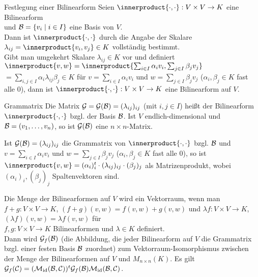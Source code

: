 \begin{Satz}{Festlegung einer Bilinearform}
    Seien $\innerproduct{\cdot, \cdot}: V \times V \rightarrow K$ eine Bilinearform \\
    und $\mathcal{B} = \{v_i \;|\; i \in I\}$ eine Basis von $V$. \\
    Dann ist $\innerproduct{\cdot, \cdot}$ durch die Angabe der Skalare
    $\lambda_{ij} = \innerproduct{v_i, v_j} \in K$ vollständig bestimmt. \\
    Gibt man umgekehrt Skalare $\lambda_{ij} \in K$ vor und definiert
    $\innerproduct{v, w} = \innerproduct{\sum_{i \in I} \alpha_i v_i, \sum_{j \in I} \beta_j v_j}$\\
    $= \sum_{i, j \in I} \alpha_i \lambda_{ij} \beta_j \in K$
    für $v = \sum_{i \in I} \alpha_i v_i$ und
    $w = \sum_{j \in I} \beta_j v_j$ ($\alpha_i, \beta_j \in K$ fast alle $0$),
    dann ist $\innerproduct{\cdot, \cdot}: V \times V \rightarrow K$ eine Bilinearform
    auf $V$.
\end{Satz}

\begin{Def}{Grammatrix}
    Die Matrix $\mathcal{G} = \mathcal{G}(\mathcal{B}) = (\lambda_{ij})_{ij}$
    (mit $i, j \in I$) heißt  der Bilinearform
    $\innerproduct{\cdot, \cdot}$ bzgl. der Basis $\mathcal{B}$.
    Ist $V$ endlich-dimensional und $\mathcal{B} = (v_1, \ldots, v_n)$,
    so ist $\mathcal{G}(\mathcal{B})$ eine $n \times n$-Matrix.
\end{Def}

\begin{Bem}
    Ist $\mathcal{G}(\mathcal{B}) = (\lambda_{ij})_{ij}$ die Grammatrix
    von $\innerproduct{\cdot, \cdot}$ bzgl. $\mathcal{B}$ und
    $v = \sum_{i \in I} \alpha_i v_i$ und $w = \sum_{j \in I} \beta_j v_j$
    ($\alpha_i, \beta_j \in K$ fast alle $0$), so ist
    $\innerproduct{v, w} = (\alpha_i)_i^t \cdot (\lambda_{ij})_{ij} \cdot (\beta_j)_j$
    als Matrizenprodukt, wobei $(\alpha_i)_i, (\beta_j)_j$ Spaltenvektoren
    sind.
\end{Bem}

\begin{Bem}
    Die Menge der Bilinearformen auf $V$ wird ein Vektorraum, wenn
    man $f+g: V \times V \rightarrow K$, $(f+g)(v, w) = f(v, w) + g(v, w)$
    und $\lambda f: V \times V \rightarrow K$,
    $(\lambda f)(v, w) = \lambda f(v, w)$ für \\
    $f, g: V \times V \rightarrow K$
    Bilinearformen und $\lambda \in K$ definiert. \\
    Dann wird $\mathcal{G}_f(\mathcal{B})$ (die Abbildung, die jeder Bilinearform
    auf $V$ die Grammatrix bzgl. einer festen Basis $\mathcal{B}$ zuordnet)
    zum Vektorraum-Isomorphismus zwischen der Menge der Bilinearformen
    auf $V$ und $M_{n \times n}(K)$.
    Es gilt $\mathcal{G}_f(\mathcal{C}) = (\mathcal{M}_{\operatorname{id}}(\mathcal{B},\mathcal{C}))^t
    \mathcal{G}_f(\mathcal{B}) \mathcal{M}_{\operatorname{id}}(\mathcal{B},\mathcal{C})$.
\end{Bem}

